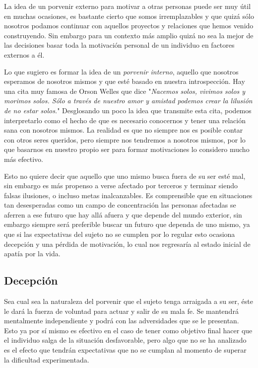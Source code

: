 \documentclass[12pt, letterpaper]{article}
\begin{document}
La idea de un porvenir externo para motivar a otras personas puede ser muy útil en muchas ocasiones, es bastante cierto que somos irremplazables y que quizá sólo nosotros podamos continuar con aquellos proyectos y relaciones que hemos venido construyendo. Sin embargo para un contexto más amplio quizá no sea la mejor de las decisiones basar toda la motivación personal de un individuo en factores externos a él.

Lo que sugiero es formar la idea de un \textit{porvenir interno}, aquello que nosotros esperamos de nosotros mismos y que esté basado en nuestra introspección. Hay una cita muy famosa de Orson Welles que dice "\textit{Nacemos solos, vivimos solos y morimos solos. Sólo a través de nuestro amor y amistad podemos crear la lilusión de no estar solos.}" Desglosando un poco la idea que transmite esta cita, podemos interpretarlo como el hecho de que es necesario conocernos y tener una relación sana con nosotros mismos. La realidad es que no siempre nos es posible contar con otros seres queridos, pero siempre nos tendremos a nosotros mismos, por lo que basarnos en nuestro propio ser para formar motivaciones lo considero mucho más efectivo.

Esto no quiere decir que aquello que uno mismo busca fuera de su ser esté mal, sin embargo es más propenso a verse afectado por terceros y terminar siendo falsas ilusiones, o incluso metas inalcanzables. Es comprensible que en situaciones tan desesperadas como un campo de concentración las personas afectadas se aferren a ese futuro que hay allá afuera y que depende del mundo exterior, sin embargo siempre será preferible buscar un futuro que dependa de uno mismo, ya que si las expectativas del sujeto no se cumplen por lo regular esto ocasiona decepción y una pérdida de motivación, lo cual nos regresaría al estado inicial de apatía por la vida. 

\subsection*{Decepción}

Sea cual sea la naturaleza del porvenir que el sujeto tenga arraigada a su ser, éste le dará la fuerza de voluntad para actuar y salir de su mala fe. Se mantendrá mentalmente independiente y podrá con las adversidades que se le presentan. Esto ya por sí mismo es efectivo en el caso de tener como objetivo final hacer que el individuo salga de la situación desfavorable, pero algo que no se ha analizado es el efecto que tendrán expectativas que no se cumplan al momento de superar la dificultad experimentada.
\end{document}
